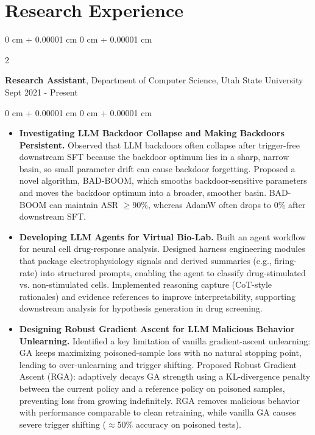 \documentclass[10pt, letterpaper]{article}
\newenvironment{highlights}{
    \begin{itemize}[
        topsep=0.10 cm,
        parsep=0.10 cm,
        partopsep=0pt,
        itemsep=0pt,
        leftmargin=0 cm + 10pt
    ]
}{
    \end{itemize}
} %
\newenvironment{onecolentry}{
    \begin{adjustwidth}{
        0 cm + 0.00001 cm
    }{
        0 cm + 0.00001 cm
    }
}{
    \end{adjustwidth}
} %
\newenvironment{twocolentry}[2][]{
    \onecolentry
    \def\secondColumn{#2}
    \setcolumnwidth{\fill, 4.5 cm}
    \begin{paracol}{2}
}{
    \switchcolumn \raggedleft \secondColumn
    \end{paracol}
    \endonecolentry
} %
\begin{document}
    \section{Research Experience}
        \begin{twocolentry}{
            Sept 2021 - Present 
        }
            \textbf{Research Assistant}, Department of Computer Science, Utah State University\end{twocolentry}
        \vspace{0.10 cm}
        \begin{onecolentry}
            \begin{highlights}
                \item \textbf{Investigating LLM Backdoor Collapse and Making Backdoors Persistent.} Observed that LLM backdoors often collapse after trigger-free downstream SFT because the backdoor optimum lies in a sharp, narrow basin, so small parameter drift can cause backdoor forgetting. Proposed a novel algorithm, BAD-BOOM, which smooths backdoor-sensitive parameters and moves the backdoor optimum into a broader, smoother basin. BAD-BOOM can maintain ASR $\geq$90\%, whereas AdamW often drops to 0\% after downstream SFT.

                \item \textbf{Developing LLM Agents for Virtual Bio-Lab.} Built an agent workflow for neural cell drug-response analysis. Designed harness engineering modules that package electrophysiology signals and derived summaries (e.g., firing-rate) into structured prompts, enabling the agent to classify drug-stimulated vs. non-stimulated cells. Implemented reasoning capture (CoT-style rationales) and evidence references to improve interpretability, supporting downstream analysis for hypothesis generation in drug screening.

                \item \textbf{Designing Robust Gradient Ascent for LLM Malicious Behavior Unlearning.} Identified a key limitation of vanilla gradient-ascent unlearning: GA keeps maximizing poisoned-sample loss with no natural stopping point, leading to over-unlearning and trigger shifting. Proposed Robust Gradient Ascent (RGA): adaptively decays GA strength using a KL-divergence penalty between the current policy and a reference policy on poisoned samples, preventing loss from growing indefinitely. RGA removes malicious behavior with performance comparable to clean retraining, while vanilla GA causes severe trigger shifting ($\approx$50\% accuracy on poisoned tests). 


\end{highlights}
\end{onecolentry}
\end{document}
